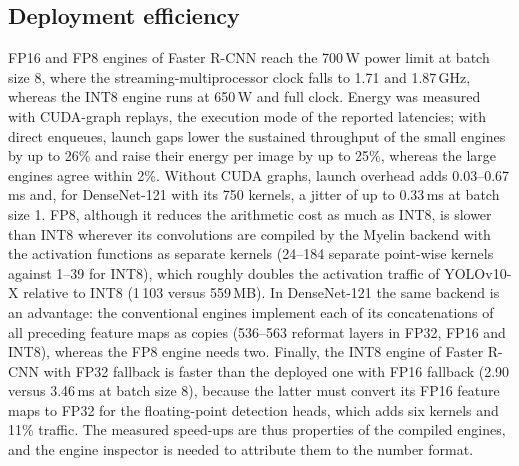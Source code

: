 \documentclass[pdflatex,sn-mathphys-num]{sn-jnl}%
\theoremstyle{thmstyleone}%
\theoremstyle{thmstyletwo}%
\theoremstyle{thmstylethree}%
\begin{document}
\begin{appendices}
\subsection{Deployment efficiency}\label{sec:supp-res-speed}
FP16 and FP8 engines of Faster R-CNN reach the 700\,W power limit at batch size 8, where the streaming-multiprocessor clock falls to 1.71 and 1.87\,GHz, whereas the INT8 engine runs at 650\,W and full clock. Energy was measured with CUDA-graph replays, the execution mode of the reported latencies; with direct enqueues, launch gaps lower the sustained throughput of the small engines by up to 26\% and raise their energy per image by up to 25\%, whereas the large engines agree within 2\%. Without CUDA graphs, launch overhead adds 0.03--0.67\,ms and, for DenseNet-121 with its 750 kernels, a jitter of up to 0.33\,ms at batch size 1. FP8, although it reduces the arithmetic cost as much as INT8, is slower than INT8 wherever its convolutions are compiled by the Myelin backend with the activation functions as separate kernels (24--184 separate point-wise kernels against 1--39 for INT8), which roughly doubles the activation traffic of YOLOv10-X relative to INT8 (1\,103 versus 559\,MB). In DenseNet-121 the same backend is an advantage: the conventional engines implement each of its concatenations of all preceding feature maps as copies (536--563 reformat layers in FP32, FP16 and INT8), whereas the FP8 engine needs two. Finally, the INT8 engine of Faster R-CNN with FP32 fallback is faster than the deployed one with FP16 fallback (2.90 versus 3.46\,ms at batch size 8), because the latter must convert its FP16 feature maps to FP32 for the floating-point detection heads, which adds six kernels and 11\% traffic. The measured speed-ups are thus properties of the compiled engines, and the engine inspector is needed to attribute them to the number format.


\end{appendices}
\end{document}
